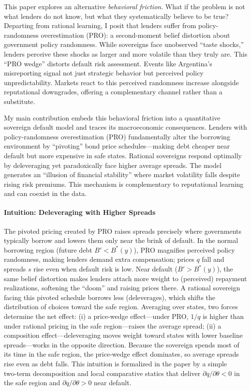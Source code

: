 \documentclass[12pt]{article}
\theoremstyle{plain}
\begin{document}
This paper explores an alternative \textit{behavioral friction}. What if the
problem is not what lenders do not know, but what they systematically believe
to be true? Departing from rational learning, I posit that lenders suffer from
policy-randomness overestimation (PRO): a second-moment belief distortion about
government policy randomness. While sovereigns face unobserved ``taste
shocks,'' lenders perceive these shocks as larger and more volatile than they
truly are. This ``PRO wedge'' distorts default risk assessment. Events like
Argentina's misreporting signal not just strategic behavior but perceived
policy unpredictability. Markets react to this perceived randomness increase
alongside reputational downgrades, offering a complementary channel rather than
a substitute.

My main contribution embeds this behavioral friction into a quantitative
sovereign default model and traces its macroeconomic consequences. Lenders with
policy-randomness overestimation (PRO) fundamentally alter the borrowing
environment by ``pivoting'' bond price schedules—making debt cheaper near
default but more expensive in safe states. Rational sovereigns respond
optimally by deleveraging yet paradoxically face higher average spreads. The
model generates an “illusion of financial stability” where market volatility
falls despite rising risk premiums. This mechanism is complementary to
reputational learning and can coexist in the data.

\paragraph{Intuition: Deleveraging with Higher Spreads}
The pivoted pricing created by PRO raises spreads precisely where governments
typically borrow and lowers them only near the brink of default. In the normal
borrowing region (future debt $B' < B^*(y)$), PRO magnifies perceived policy
randomness, making lenders demand extra compensation; prices $q$ fall and
spreads $s$ rise even when default risk is low. Near default ($B' > B^*(y)$),
the same belief distortion makes lenders attach more weight to (perceived)
repayment realizations, softening the “doom” and raising prices there. A
rational sovereign facing this pivoted schedule borrows less (deleverages),
which shifts the distribution of choices toward the safe region. Averaging over
states, two forces determine the net effect: (i) a price‑wedge effect—under
PRO, $1/q$ is higher than under rational pricing in the safe region—raises the
average spread; (ii) a composition effect—deleveraging moves weight toward
states with lower baseline spreads—works in the opposite direction. Because the
sovereign spends most of its time in the safe region, the price‑wedge effect
dominates, so average spreads rise even as debt falls. This intuition is
formalized in the paper by a simple two‑term decomposition and local
comparative statics that deliver $\partial q/\partial \theta < 0$ in the safe
region and $\partial q/\partial \theta > 0$ near default.
\end{document}
